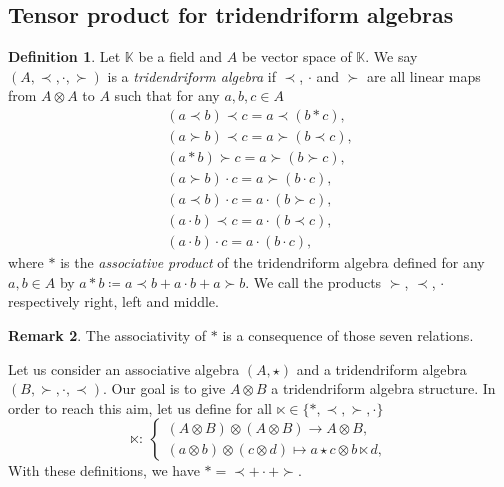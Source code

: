 \documentclass[10pt,a4paper]{amsart}
\numberwithin{equation}{section}
\theoremstyle{definition}
\newtheorem{defi}{Definition}[section]
\newtheorem{Rq}[defi]{Remark}
\theoremstyle{plain}
\newcommand{\K}{\mathbb{K}}
\begin{document}
\subsection{Tensor product for tridendriform algebras} \label{sec:tensor}
\begin{defi}\label{def:tridend}
	Let $\K$ be a field and $A$ be vector space of $\K$. We say $(A,\prec,\cdot,\succ)$ is a \emph{tridendriform algebra} if $\prec$, $\cdot$ and $\succ$ are all linear maps from $A\otimes A$ to $A$ such that for any $a,b,c\in A$
	\begin{gather}
		(a\prec b)\prec c =a\prec(b*c), \label{tri1}\\
		(a\succ b)\prec c =a\succ(b\prec c), \label{tri2}\\
		(a* b)\succ c =a\succ(b\succ c), \label{tri3} \\
		(a\succ b)\cdot c =a\succ(b\cdot c), \label{tri4} \\
		(a\prec b)\cdot c =a\cdot(b\succ c), \label{tri5} \\
		(a\cdot b)\prec c =a\cdot(b\prec c), \label{tri6} \\
		(a\cdot b)\cdot c =a\cdot (b\cdot c), \label{tri7}
	\end{gather}
where $*$ is the \emph{associative product} of the tridendriform algebra defined for any $a,b\in A$ by $a*b\coloneqq a\prec b + a\cdot b +a\succ b$.
We call the products $\succ$, $\prec$, $\cdot$ respectively right, left and middle.
\end{defi}
\begin{Rq}
	The associativity of $*$ is a consequence of those seven relations.
\end{Rq}
 Let us consider an associative algebra $(A,\star)$ and a tridendriform algebra $(B,\succ,\cdot,\prec)$.
 Our goal is to give $A\otimes B$ a tridendriform algebra structure. In order to reach this aim, let us define for all $\ltimes\in\{*,\prec,\succ,\cdot\}$
\begin{equation*}
\ltimes\colon \ \begin{cases}
(A\otimes B)\otimes (A\otimes B) \rightarrow A\otimes B, \\
(a\otimes b)\otimes (c\otimes d)\mapsto a \star c\otimes b\ltimes d,
\end{cases}
\end{equation*}
 With these definitions, we have $*=\prec +\cdot +\succ$.
\end{document}
